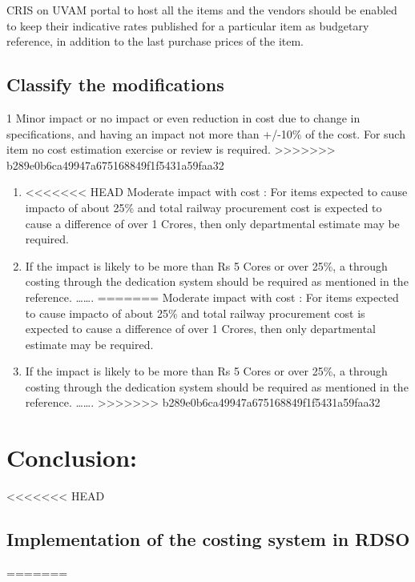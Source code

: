 \documentclass[
  11pt,
  twoside]{article}
\begin{document}
CRIS on UVAM portal to host all the items and the vendors should be enabled to keep their indicative rates published for a particular item as budgetary reference, in addition to the last purchase prices of the item.

\hypertarget{classify-the-modifications}{%
\subsection{Classify the modifications}\label{classify-the-modifications}}

1 Minor impact or no impact or even reduction in cost due to change in specifications, and having an impact not more than +/-10\% of the cost. For such item no cost estimation exercise or review is required.
>>>>>>> b289e0b6ca49947a675168849f1f5431a59faa32

\begin{enumerate}
\def\labelenumi{\arabic{enumi}.}
\setcounter{enumi}{1}
\item
<<<<<<< HEAD
  Moderate impact with cost : For items expected to cause impacto of
  about 25\% and total railway procurement cost is expected to cause a
  difference of over 1 Crores, then only departmental estimate may be
  required.
\item
  If the impact is likely to be more than Rs 5 Cores or over 25\%, a
  through costing through the dedication system should be required as
  mentioned in the reference. \ldots\ldots.
=======
  Moderate impact with cost : For items expected to cause impacto of about 25\% and total railway procurement cost is expected to cause a difference of over 1 Crores, then only departmental estimate may be required.
\item
  If the impact is likely to be more than Rs 5 Cores or over 25\%, a through costing through the dedication system should be required as mentioned in the reference. \ldots\ldots.
>>>>>>> b289e0b6ca49947a675168849f1f5431a59faa32
\end{enumerate}

\hypertarget{conclusion}{%
\section{Conclusion:}\label{conclusion}}

\hypertarget{implementation-of-the-costing-system-in-rdso}{%
<<<<<<< HEAD
\subsection{Implementation of the costing system in
RDSO}\label{implementation-of-the-costing-system-in-rdso}}
=======
\end{document}
